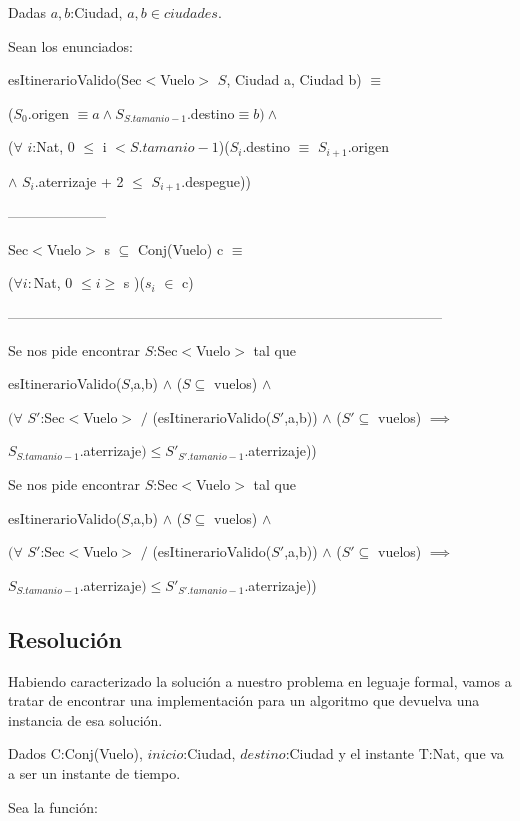 Dadas $a,b$:Ciudad, $a,b \in ciudades$. 

Sean los enunciados:

esItinerarioValido(Sec$<$Vuelo$>$ $S$, Ciudad a, Ciudad b) $\equiv$
 
($S_{0}$.origen $\equiv a \wedge S_{S.tamanio-1}$.destino$ \equiv b) \wedge$ 

($\forall$ $i$:Nat, 0 $\leq$ i $<S.tamanio-1$)($S_{i}$.destino $\equiv$ $S_{i+1}$.origen 

$\wedge$ $S_{i}$.aterrizaje + 2 $\leq$ $S_{i+1}$.despegue))

---------------------

Sec$<$Vuelo$>$ s $\subseteq$ Conj(Vuelo) c $\equiv$ 

($\forall i:$Nat, 0 $\leq i \geq$ s )($s_{i}$ $\in $ c) 
 
---------------------------------------------------------------------------------------------

Se nos pide encontrar $S$:Sec$<$Vuelo$>$ tal que 

esItinerarioValido($S$,a,b) $\wedge$ ($S \subseteq$ vuelos) $\wedge$ 

$(\forall$ $S'$:Sec$<$Vuelo$>$ $/$ (esItinerarioValido($S'$,a,b)) $\wedge$ ($S' \subseteq$ vuelos) $\implies$  

$S_{S.tamanio-1}$.aterrizaje$) \leq S'_{S'.tamanio-1}$.aterrizaje))

Se nos pide encontrar $S$:Sec$<$Vuelo$>$ tal que 

esItinerarioValido($S$,a,b) $\wedge$ ($S \subseteq$ vuelos) $\wedge$ 

$(\forall$ $S'$:Sec$<$Vuelo$>$ $/$ (esItinerarioValido($S'$,a,b)) $\wedge$ ($S' \subseteq$ vuelos) $\implies$  

$S_{S.tamanio-1}$.aterrizaje$) \leq S'_{S'.tamanio-1}$.aterrizaje))


\newpage
\subsection{Resolución}

Habiendo caracterizado la soluci\'on a nuestro problema en leguaje formal, vamos a tratar de encontrar una implementaci\'on para un algoritmo que devuelva una instancia de esa soluci\'on.

Dados C:Conj(Vuelo), $inicio$:Ciudad, $destino$:Ciudad y el instante T:Nat, que va a ser un instante de tiempo.

Sea la funci\'on:

